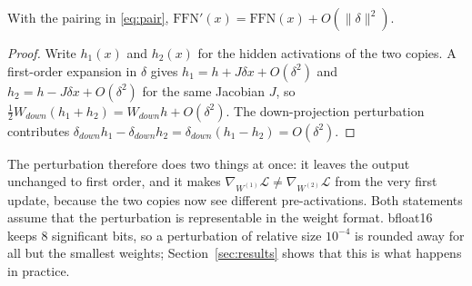 \begin{proposition}
\label{prop:drift}
With the pairing in \eqref{eq:pair}, $\mathrm{FFN}'(x)=\mathrm{FFN}(x)+O(\|\delta\|^2)$.
\end{proposition}
\begin{proof}
Write $h_{1}(x)$ and $h_{2}(x)$ for the hidden activations of the two copies. A first-order expansion in $\delta$ gives $h_{1}=h+J\delta x+O(\delta^2)$ and $h_{2}=h-J\delta x+O(\delta^2)$ for the same Jacobian $J$, so $\tfrac{1}{2}W_{down}(h_{1}+h_{2})=W_{down}h+O(\delta^2)$. The down-projection perturbation contributes $\delta_{down}h_{1}-\delta_{down}h_{2}=\delta_{down}(h_{1}-h_{2})=O(\delta^2)$.
\end{proof}
The perturbation therefore does two things at once: it leaves the output unchanged to first order, and it makes $\nabla_{W^{(1)}}\mathcal{L}\neq\nabla_{W^{(2)}}\mathcal{L}$ from the very first update, because the two copies now see different pre-activations. Both statements assume that the perturbation is representable in the weight format. bfloat16 keeps 8 significant bits, so a perturbation of relative size $10^{-4}$ is rounded away for all but the smallest weights; Section~\ref{sec:results} shows that this is what happens in practice.

